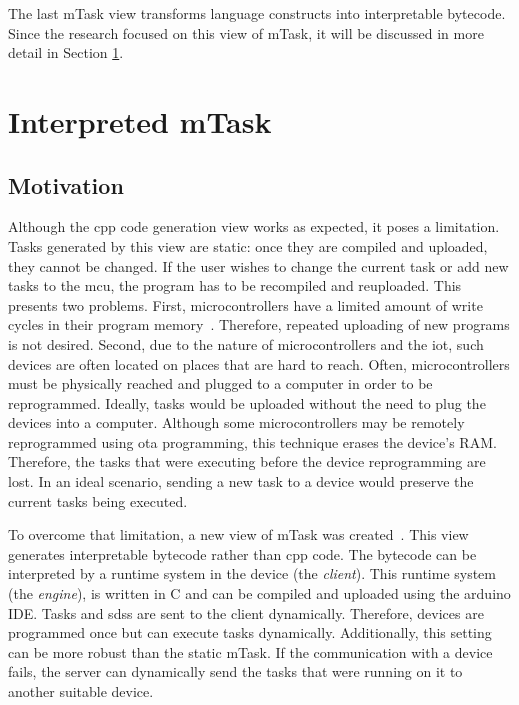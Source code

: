 The last \gls{mTask} view transforms language constructs into interpretable bytecode. Since the research focused on this view of \gls{mTask}, it will be discussed in more detail in Section \ref{sec:int_mtask}.

\section{Interpreted mTask}\label{sec:int_mtask}

\subsection{Motivation}

Although the \gls{cpp} code generation view works as expected, it poses a limitation. Tasks generated by this view are static: once they are compiled and uploaded, they cannot be changed. If the user wishes to change the current task or add new tasks to the \gls{mcu}, the program has to be recompiled and reuploaded. This presents two problems. First, microcontrollers have a limited amount of write cycles in their program memory~\cite{martthesis}. Therefore, repeated uploading of new programs is not desired. Second, due to the nature of microcontrollers and the \ac{iot}, such devices are often located on places that are hard to reach. Often, microcontrollers must be physically reached and plugged to a computer in order to be reprogrammed. Ideally, tasks would be uploaded without the need to plug the devices into a computer. Although some microcontrollers may be remotely reprogrammed using \acl{ota} programming, this technique erases the device's RAM. Therefore, the tasks that were executing before the device reprogramming are lost. In an ideal scenario, sending a new task to a device would preserve the current tasks being executed.

To overcome that limitation, a new view of \gls{mTask} was created~\cite{martthesis}. This view generates interpretable bytecode rather than \gls{cpp} code. The bytecode can be interpreted by a runtime system in the device (the \textit{client}). This runtime system (the \textit{engine}), is written in C and can be compiled and uploaded using the \gls{arduino} IDE. Tasks and \acp{sds} are sent to the client dynamically. Therefore, devices are programmed once but can execute tasks dynamically. Additionally, this setting can be more robust than the static \gls{mTask}. If the communication with a device fails, the server can dynamically send the tasks that were running on it to another suitable device. 

